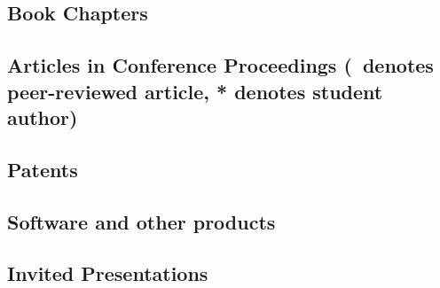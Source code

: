 \documentclass[10pt]{article}
\begin{document}
    \subsection[Book Chapters]{Book Chapters}
    \begin{refsection}
        \nocite{*}
        \printbibliography[heading=none,type=incollection]
    \end{refsection}
  \subsection[Articles in Conference Proceedings]{Articles in Conference Proceedings {\small (\peerrevmark\ denotes peer-reviewed article, * denotes student author)}}
    \begin{refsection}
        \nocite{*}
        \printbibliography[heading=none,type=inproceedings]
    \end{refsection}
  \subsection{Patents}
    \begin{refsection}
        \nocite{*}
        \printbibliography[heading=none,type=patent]
       \end{refsection}
  \subsection{Software and other products}
  
  \subsection{Invited Presentations}
    \begin{enumerate}
    
    
    \end{enumerate}
  \iffalse
  \subsection{Published Abstracts}
    \begin{enumerate}
    
    
    \end{enumerate}
    \fi
\end{document}
